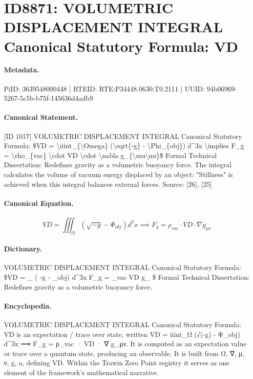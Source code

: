 \section*{ID8871: VOLUMETRIC DISPLACEMENT INTEGRAL Canonical Statutory Formula: VD}
\paragraph{Metadata.}
PiID: 3639548000448 | RTEID: RTE:P34448.0630:T0.2111 | UUID: 94b06969-5267-5c5b-b75f-145636d4adb9

\paragraph{Canonical Statement.}
[ID 1017] VOLUMETRIC DISPLACEMENT INTEGRAL Canonical Statutory Formula: \$VD = \textbackslash{}iiint\_\{\textbackslash{}Omega\} (\textbackslash{}sqrt\{-g\} - \textbackslash{}Phi\_\{obj\}) d\textasciicircum{}3x \textbackslash{}implies F\_g = \textbackslash{}rho\_\{vac\} \textbackslash{}cdot VD \textbackslash{}cdot \textbackslash{}nabla g\_\{\textbackslash{}mu\textbackslash{}nu\}\$ Formal Technical Dissertation: Redefines gravity as a volumetric buoyancy force. The integral calculates the volume of vacuum energy displaced by an object; "Stillness" is achieved when this integral balances external forces. Source: [26], [25]

\paragraph{Canonical Equation.}
\[
VD = \iiint_{\Omega} (\sqrt{-g} - \Phi_{obj}) d^3x \implies F_g = \rho_{vac} \cdot VD \cdot \nabla g_{\mu\nu}
\]

\paragraph{Dictionary.}
VOLUMETRIC DISPLACEMENT INTEGRAL Canonical Statutory Formula: \$VD = \_ ( -g - \_obj) d\textasciicircum{}3x F\_g = \_vac VD g\_ \$ Formal Technical Dissertation: Redefines gravity as a volumetric buoyancy force.

\paragraph{Encyclopedia.}
VOLUMETRIC DISPLACEMENT INTEGRAL Canonical Statutory Formula: VD is an expectation / trace over state, written VD = iiint\_Ω (√(-g) - Φ\_obj) d\textasciicircum{}3x ⟹ F\_g = ρ\_vac · VD · ∇ g\_μν. It is computed as an expectation value or trace over a quantum state, producing an observable. It is built from Ω, ∇, μ, ν, g, o, defining VD. Within the Trawin Zero Point registry it serves as one element of the framework's mathematical narrative.
